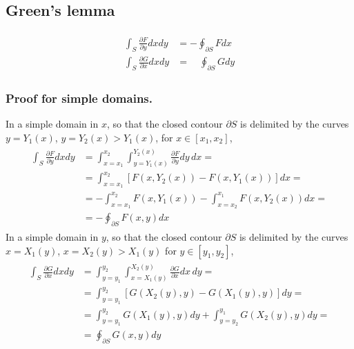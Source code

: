 \documentclass[letterpaper,10pt,english]{jupyterBook}
\begin{document}
\subsection{Green’s lemma}
\label{\detokenize{ch/multivariable/intro:green-s-lemma}}\label{\detokenize{ch/multivariable/intro:multivariable-calculus-green-lemma}}\begin{equation*}
\begin{split}\begin{aligned}
  \int_{S} \frac{\partial F}{\partial y} dx dy & =     - \oint_{\partial S} F dx \\
  \int_{S} \frac{\partial G}{\partial x} dx dy & = \quad \oint_{\partial S} G dy   
\end{aligned}\end{split}
\end{equation*}\subsubsection*{Proof for simple domains.}

\sphinxAtStartPar
In a simple domain in  \(x\), so that the closed contour \(\partial S\) is delimited by the curves \(y=Y_1(x)\), \(y=Y_2(x) > Y_1(x)\), for \(x \in [x_1, x_2]\),
\begin{equation*}
\begin{split}\begin{aligned}
  \int_{S} \frac{\partial F}{\partial y} dx dy 
  & =   \int_{x=x_1}^{x_2} \int_{y = Y_1(x)}^{Y_2(x)} \frac{\partial F}{\partial y} dy \, dx = \\
  & =   \int_{x=x_1}^{x_2} \left[ F(x,Y_2(x)) - F(x,Y_1(x)) \right] dx = \\
  & = - \int_{x=x_1}^{x_2} F(x,Y_1(x)) - \int_{x=x_2}^{x_1} F(x, Y_2(x)) dx = \\
  & = - \oint_{\partial S} F(x,y) dx 
\end{aligned}\end{split}
\end{equation*}
\sphinxAtStartPar
In a simple domain in  \(y\), so that the closed contour \(\partial S\) is delimited by the curves \(x=X_1(y)\), \(x=X_2(y) > X_1(y)\) for \(y \in [y_1, y_2]\),
\begin{equation*}
\begin{split}\begin{aligned}
  \int_{S} \frac{\partial G}{\partial x} dx dy 
  & = \int_{y=y_1}^{y_2} \int_{x = X_1(y)}^{X_2(y)} \frac{\partial G}{\partial x} dx \, dy = \\
  & = \int_{y=y_1}^{y_2} \left[ G(X_2(y),y) - G(X_1(y),y) \right] dy = \\
  & = \int_{y=y_1}^{y_2} G(X_1(y),y) dy + \int_{y=y_2}^{y_1} G(X_2(y),y) dy = \\
  & = \oint_{\partial S} G(x,y) dy 
\end{aligned}\end{split}
\end{equation*}
\sphinxstepscope
\end{document}
